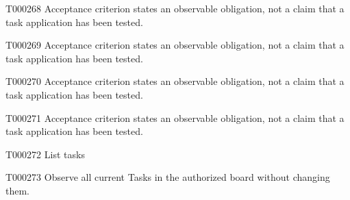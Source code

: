 \documentclass[11pt,a4paper]{article}
\begin{document}
\begin{atlasparagraph}{T000268}
Acceptance criterion states an observable obligation, not a claim that a task application has been tested.
\end{atlasparagraph}
\begin{atlasparagraph}{T000269}
Acceptance criterion states an observable obligation, not a claim that a task application has been tested.
\end{atlasparagraph}
\begin{atlasparagraph}{T000270}
Acceptance criterion states an observable obligation, not a claim that a task application has been tested.
\end{atlasparagraph}
\begin{atlasparagraph}{T000271}
Acceptance criterion states an observable obligation, not a claim that a task application has been tested.
\end{atlasparagraph}
\begin{atlastext}{T000272}
List tasks
\end{atlastext}
\begin{atlasparagraph}{T000273}
Observe all current Tasks in the authorized board without changing them.
\end{atlasparagraph}
\end{document}
